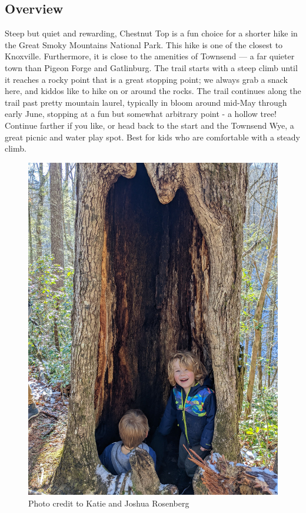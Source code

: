\documentclass[
  letterpaper,
  DIV=11,
  numbers=noendperiod]{scrreprt}
\begin{document}
\subsection{Overview}\label{overview-27}

Steep but quiet and rewarding, Chestnut Top is a fun choice for a
shorter hike in the Great Smoky Mountains National Park. This hike is
one of the closest to Knoxville. Furthermore, it is close to the
amenities of Townsend --- a far quieter town than Pigeon Forge and
Gatlinburg. The trail starts with a steep climb until it reaches a rocky
point that is a great stopping point; we always grab a snack here, and
kiddos like to hike on or around the rocks. The trail continues along
the trail past pretty mountain laurel, typically in bloom around mid-May
through early June, stopping at a fun but somewhat arbitrary point - a
hollow tree! Continue farther if you like, or head back to the start and
the Townsend Wye, a great picnic and water play spot. Best for kids who
are comfortable with a steady climb.

\begin{figure}[H]

{\centering \includegraphics[width=6.25in,height=\textheight,keepaspectratio]{img/trail-27-figure-01.jpg}

}

\caption{Photo credit to Katie and Joshua Rosenberg}

\end{figure}%
\end{document}
